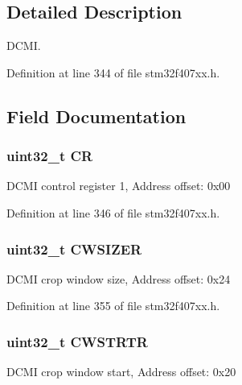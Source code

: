 \subsection{Detailed Description}
D\+C\+MI. 

Definition at line 344 of file stm32f407xx.\+h.



\subsection{Field Documentation}
\subsubsection[{\texorpdfstring{CR}{CR}}]{ uint32\+\_\+t CR}\hypertarget{struct_d_c_m_i___type_def_ab40c89c59391aaa9d9a8ec011dd0907a}{}\label{struct_d_c_m_i___type_def_ab40c89c59391aaa9d9a8ec011dd0907a}
D\+C\+MI control register 1, Address offset\+: 0x00 

Definition at line 346 of file stm32f407xx.\+h.

\subsubsection[{\texorpdfstring{C\+W\+S\+I\+Z\+ER}{CWSIZER}}]{ uint32\+\_\+t C\+W\+S\+I\+Z\+ER}\hypertarget{struct_d_c_m_i___type_def_aa3ccc5d081bbee3c61ae9aa5e0c83af9}{}\label{struct_d_c_m_i___type_def_aa3ccc5d081bbee3c61ae9aa5e0c83af9}
D\+C\+MI crop window size, Address offset\+: 0x24 

Definition at line 355 of file stm32f407xx.\+h.

\subsubsection[{\texorpdfstring{C\+W\+S\+T\+R\+TR}{CWSTRTR}}]{ uint32\+\_\+t C\+W\+S\+T\+R\+TR}\hypertarget{struct_d_c_m_i___type_def_a919b70dd8762e44263a02dfbafc7b8ce}{}\label{struct_d_c_m_i___type_def_a919b70dd8762e44263a02dfbafc7b8ce}
D\+C\+MI crop window start, Address offset\+: 0x20 


